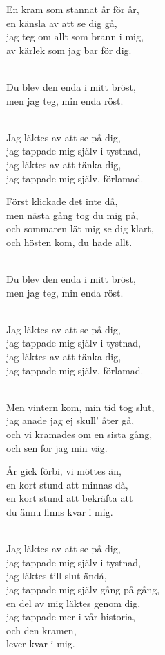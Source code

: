 \begin{lyrics}
En kram som stannat år för år,\\
en känsla av att se dig gå,\\
jag teg om allt som brann i mig,\\
av kärlek som jag bar för dig.

\\
Du blev den enda i mitt bröst,\\
men jag teg, min enda röst.

\\
Jag läktes av att se på dig,\\
jag tappade mig själv i tystnad,\\
jag läktes av att tänka dig,\\
jag tappade mig själv, förlamad.

Först klickade det inte då,\\
men nästa gång tog du mig på,\\
och sommaren lät mig se dig klart,\\
och hösten kom, du hade allt.

\\
Du blev den enda i mitt bröst,\\
men jag teg, min enda röst.

\\
Jag läktes av att se på dig,\\
jag tappade mig själv i tystnad,\\
jag läktes av att tänka dig,\\
jag tappade mig själv, förlamad.

\\
Men vintern kom, min tid tog slut,\\
jag anade jag ej skull' åter gå,\\
och vi kramades om en sista gång,\\
och sen for jag min väg.

År gick förbi, vi möttes än,\\
en kort stund att minnas då,\\
en kort stund att bekräfta att\\
du ännu finns kvar i mig.

\\
Jag läktes av att se på dig,\\
jag tappade mig själv i tystnad,\\
jag läktes till slut ändå,\\
jag tappade mig själv gång på gång,\\
en del av mig läktes genom dig,\\
jag tappade mer i vår historia,\\
och den kramen,\\
lever kvar i mig.
\end{lyrics}

